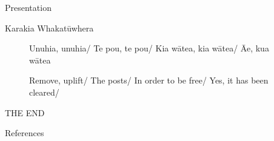\documentclass[
  ignorenonframetext,
  aspectratio=169,
]{beamer}
\begin{document}
\begin{frame}[fragile]{Presentation}
\begin{block}{Karakia Whakatūwhera}
\label{karakia-whakatux16bwhera-1}
\begin{figure}

\begin{minipage}{0.50\linewidth}
Unuhia, unuhia/ Te pou, te pou/ Kia wātea, kia wātea/ Āe, kua
wātea\end{minipage}%
%
\begin{minipage}{0.50\linewidth}
Remove, uplift/ The posts/ In order to be free/ Yes, it has been
cleared/\end{minipage}%

\end{figure}%
\end{block}
\end{frame}

\begin{frame}{THE END}
\label{the-end}
\end{frame}

\begin{frame}{References}
\label{references}
\end{frame}
\end{document}
